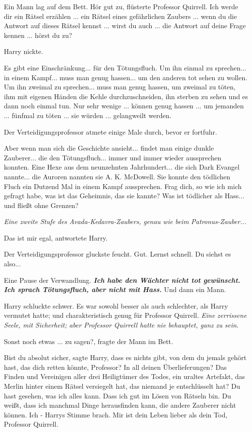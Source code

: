 Ein Mann lag auf dem Bett. \glqq{}Hör gut zu\grqq{}, flüsterte Professor
Quirrell. \glqq{}Ich werde dir ein Rätsel erzählen ... ein Rätsel eines
gefährlichen Zaubers ... wenn du die Antwort auf dieses Rätsel kennst ... wirst
du auch ... die Antwort auf deine Frage kennen ... hörst du zu?\grqq{}

Harry nickte.

\glqq{}Es gibt eine Einschränkung... für den Tötungsfluch. Um ihn einmal zu
sprechen... in einem Kampf... muss man genug hassen... um den anderen tot sehen
zu wollen. Um ihn zweimal zu sprechen... muss man genug hassen, um zweimal zu
töten, ihm mit eigenen Händen die Kehle durchzuschneiden, ihn sterben zu sehen
und es dann noch einmal tun. Nur sehr wenige ... können genug hassen ... um
jemanden ... fünfmal zu töten ... sie würden ... gelangweilt werden.\grqq{}

Der Verteidigungsprofessor atmete einige Male durch, bevor er fortfuhr.

\glqq{}Aber wenn man sich die Geschichte ansieht... findet man einige dunkle
Zauberer... die den Tötungsfluch... immer und immer wieder aussprechen konnten.
Eine Hexe aus dem neunzehnten Jahrhundert... die sich Dark Evangel nannte... die
Auroren nannten sie A. K. McDowell. Sie konnte den tödlichen Fluch ein Dutzend
Mal in einem Kampf aussprechen. Frag dich, so wie ich mich gefragt habe, was ist
das Geheimnis, das sie kannte? Was ist tödlicher als Hass... und fließt ohne
Grenzen?\grqq{}

\emph{Eine zweite Stufe des Avada-Kedavra-Zaubers, genau wie beim
Patronus-Zauber...}

\glqq{}Das ist mir egal\grqq{}, antwortete Harry.

Der Verteidigungsprofessor gluckste feucht. \glqq{}Gut. Lernst schnell. Du siehst
es also...\grqq{}

Eine Pause der Verwandlung. \glqq{}\textbf{\emph{Ich habe den Wächter nicht tot
gewünscht. Ich sprach Tötungsfluch, aber nicht mit Hass.}}\grqq{} Und dann ein Mann.

Harry schluckte schwer. Es war sowohl besser als auch schlechter, als Harry
vermutet hatte; und charakteristisch genug für Professor Quirrell. \emph{Eine
zerrissene Seele, mit Sicherheit; aber Professor Quirrell hatte nie behauptet,
ganz zu sein.}

\glqq{}Sonst noch etwas ... zu sagen?\grqq{}, fragte der Mann im Bett.

\glqq{}Bist du absolut sicher\grqq{}, sagte Harry, \glqq{}dass es nichts gibt, von
dem du jemals gehört hast, das dich retten könnte, Professor? In all deinen
Überlieferungen? Das Finden und Vereinigen aller drei Heiligtümer des Todes, ein
uraltes Artefakt, das Merlin hinter einem Rätsel versiegelt hat, das niemand je
entschlüsselt hat? Du hast gesehen, was ich alles kann. Dass ich gut im Lösen
von Rätseln bin. Du weißt, dass ich manchmal Dinge herausfinden kann, die andere
Zauberer nicht können. Ich -\grqq{} Harrys Stimme brach. \glqq{}Mir ist dein Leben
lieber als dein Tod, Professor Quirrell.\grqq{}

